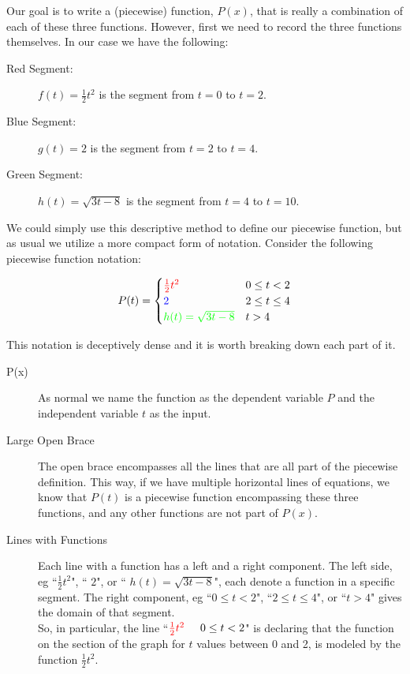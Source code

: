 \documentclass{ximeraXloud}
\begin{document}
Our goal is to write a (piecewise) function, $P(x)$, that is really a combination of each of these three functions. However, first we need to record the three functions themselves. In our case we have the following: 
\begin{description}
    \item[Red Segment:] {\color{red} $f(t) = \frac{1}{2}t^2$} is the segment from $t=0$ to $t=2$.
    \item[Blue Segment:] {\color{blue} $g(t) = 2$} is the segment from $t=2$ to $t=4$.
    \item[Green Segment:] {\color{green} $h(t) = \sqrt{3t-8}$} is the segment from $t=4$ to $t=10$.
\end{description}

We could simply use this descriptive method to define our piecewise function, but as usual we utilize a more compact form of notation. Consider the following piecewise function notation:

\[
    P(t) =
        \begin{cases}
            {\color{red}\frac{1}{2}t^2} & 0\leq t < 2 \\
            {\color{blue} 2} & 2 \leq t \leq 4 \\
            {\color{green} h(t) = \sqrt{3t-8}} & t > 4
        \end{cases}
\]

This notation is deceptively dense and it is worth breaking down each part of it. 
\begin{description}
    \item[P(x)] As normal we name the function as the dependent variable $P$ and the independent variable $t$ as the input.
    \item[Large Open Brace] The open brace encompasses all the lines that are all part of the piecewise definition. This way, if we have multiple horizontal lines of equations, we know that $P(t)$ is a piecewise function encompassing these three functions, and any other functions are not part of $P(x)$.
    \item[Lines with Functions] Each line with a function has a left and a right component. The left side, eg ``{\color{red}$\frac{1}{2}t^2$}", ``{\color{blue} $2$}", or ``{\color{green} $h(t) = \sqrt{3t-8}$}", each denote a function in a specific segment. The right component, eg ``$0\leq t < 2$", ``$2 \leq t \leq 4$", or ``$t > 4$" gives the domain of that segment.\\
    So, in particular, the line ``${\color{red}\frac{1}{2}t^2} \hspace{0.5cm} 0\leq t < 2$" is declaring that the function on the section of the graph for $t$ values between 0 and 2, is modeled by the function $\frac{1}{2}t^2$.
\end{description}
\end{document}
